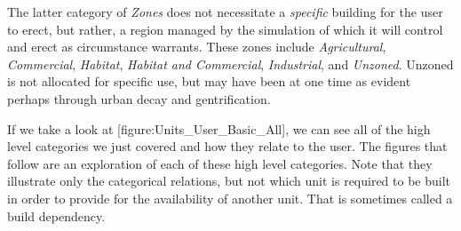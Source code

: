 The latter category of {\it Zones} does not necessitate a {\it specific} building for the user to erect, but rather, a region managed by the simulation of which it will control and erect as circumstance warrants. These zones include {\it Agricultural}, {\it Commercial}, {\it Habitat}, {\it Habitat and Commercial}, {\it Industrial}, and {\it Unzoned}. Unzoned is not allocated for specific use, but may have been at one time as evident perhaps through urban decay and gentrification.

If we take a look at [figure:Units_User_Basic_All], we can see all of the high level categories we just covered and how they relate to the user. The figures that follow are an exploration of each of these high level categories. Note that they illustrate only the categorical relations, but not which unit is required to be built in order to provide for the availability of another unit. That is sometimes called a build dependency.

\page
{}
    {}

    {}


\page
{}
    {}

    {}

\page
{}
    {}

    {}


